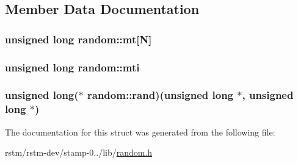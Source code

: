 \subsection{Member Data Documentation}
\hypertarget{structrandom_a88e5c20c56e6078759147a679f5bec01}{
\subsubsection[{mt}]{\setlength{\rightskip}{0pt plus 5cm}unsigned long random\-::mt\mbox{[}{\bf N}\mbox{]}}}\label{structrandom_a88e5c20c56e6078759147a679f5bec01}
\hypertarget{structrandom_a72b297b4d896cddc9103c986f6901d7d}{
\subsubsection[{mti}]{\setlength{\rightskip}{0pt plus 5cm}unsigned long random\-::mti}}\label{structrandom_a72b297b4d896cddc9103c986f6901d7d}
\hypertarget{structrandom_a1aaa791fa4cd14e5039c410455332dd4}{
\subsubsection[{rand}]{\setlength{\rightskip}{0pt plus 5cm}unsigned long($\ast$ random\-::rand)(unsigned long $\ast$, unsigned long $\ast$)}}\label{structrandom_a1aaa791fa4cd14e5039c410455332dd4}


The documentation for this struct was generated from the following file\-:\begin{DoxyCompactItemize}
\item 
rstm/rstm-\/dev/stamp-\/0../lib/\hyperlink{rstm_2rstm-dev_2stamp-0_89_810_2lib_2random_8h}{random.\-h}\end{DoxyCompactItemize}
